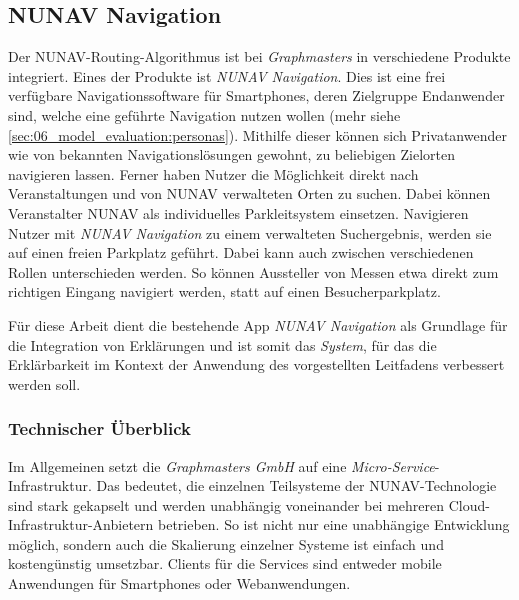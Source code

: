 \subsection{NUNAV Navigation}

Der NUNAV-Routing-Algorithmus ist bei \textit{Graphmasters} in verschiedene Produkte integriert. Eines der Produkte ist \textit{NUNAV Navigation}. Dies ist eine frei verfügbare Navigationssoftware für Smartphones, deren Zielgruppe Endanwender sind, welche eine geführte Navigation nutzen wollen (mehr siehe \autoref{sec:06_model_evaluation:personas}). Mithilfe dieser können sich Privatanwender wie von bekannten Navigationslösungen gewohnt, zu beliebigen Zielorten navigieren lassen. Ferner haben Nutzer die Möglichkeit direkt nach Veranstaltungen und von NUNAV verwalteten Orten zu suchen. Dabei können Veranstalter NUNAV als individuelles Parkleitsystem einsetzen. Navigieren Nutzer mit \textit{NUNAV Navigation} zu einem verwalteten Suchergebnis, werden sie auf einen freien Parkplatz geführt. Dabei kann auch zwischen verschiedenen Rollen unterschieden werden. So können Aussteller von Messen etwa direkt zum richtigen Eingang navigiert werden, statt auf einen Besucherparkplatz.

Für diese Arbeit dient die bestehende App \textit{NUNAV Navigation} als Grundlage für die Integration von Erklärungen und ist somit das \textit{System}, für das die Erklärbarkeit im Kontext der Anwendung des vorgestellten Leitfadens verbessert werden soll.

\subsubsection{Technischer Überblick}

Im Allgemeinen setzt die \textit{Graphmasters GmbH} auf eine \textit{Micro-Service}-Infrastruktur. Das bedeutet, die einzelnen Teilsysteme der NUNAV-Technologie sind stark gekapselt und werden unabhängig voneinander bei mehreren Cloud-Infrastruktur-Anbietern betrieben. So ist nicht nur eine unabhängige Entwicklung möglich, sondern auch die Skalierung einzelner Systeme ist einfach und kostengünstig umsetzbar. Clients für die Services sind entweder mobile Anwendungen für Smartphones oder Webanwendungen.

